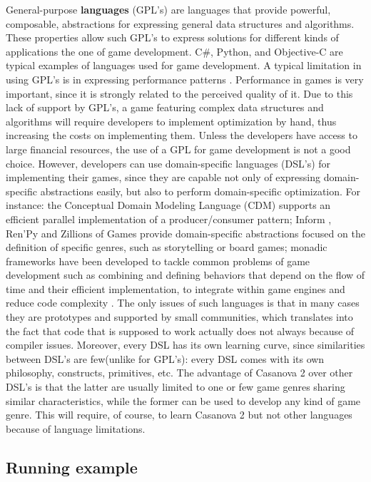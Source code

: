 General-purpose \textbf{languages} (GPL's) are languages that provide powerful, composable, abstractions for expressing general data structures and algorithms. These properties allow such GPL's to express solutions for different kinds of applications the one of game development. C\#, Python, and Objective-C are typical examples of languages used for game development. A typical limitation in using GPL's is in expressing performance patterns \cite{cheung2015bridging}. Performance in games is very important, since it is strongly related to the perceived quality of it. Due to this lack of support by GPL's, a game featuring complex data structures and algorithms will require developers to implement optimization by hand, thus increasing the costs on implementing them. Unless the developers have access to large financial resources, the use of a GPL for game development is not a good choice. However, developers can use domain-specific languages (DSL's) for implementing their games, since they are capable not only of expressing domain-specific abstractions easily, but also to perform domain-specific optimization. For instance: the Conceptual Domain Modeling Language (CDM) \cite{best2009searching} supports an efficient parallel implementation of a producer/consumer pattern; Inform \cite{reed2010creating}, Ren'Py \cite{fatemi2014cross} and Zillions of Games \cite{mallett1998zillions} provide domain-specific abstractions focused on the definition of specific genres, such as storytelling or board games; monadic frameworks have been developed to tackle common problems of game development such as combining and defining behaviors that depend on the flow of time and their efficient implementation, to integrate within game engines \cite{maggiore2011monadic} and reduce code complexity \cite{tabareau2013typed}. The only issues of such languages is that in many cases they are prototypes and supported by small communities, which translates into the fact that code that is supposed to work actually does not always because of compiler issues. Moreover, every DSL has its own learning curve, since similarities between DSL's are few(unlike for GPL's): every DSL comes with its own philosophy, constructs, primitives, etc. The advantage of Casanova 2 over other DSL's is that the latter are usually limited to one or few game genres sharing similar characteristics, while the former can be used to develop any kind of game genre. This will require, of course, to learn Casanova 2 but not other languages because of language limitations.


\subsection{Running example}

